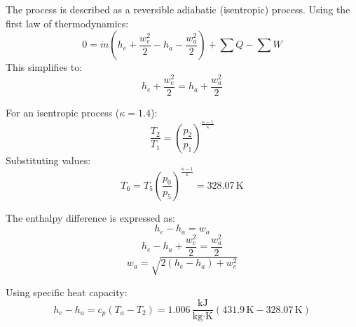 The process is described as a reversible adiabatic (isentropic) process. Using the first law of thermodynamics:  
\[
0 = \dot{m} \left( h_e + \frac{w_e^2}{2} - h_a - \frac{w_a^2}{2} \right) + \sum Q - \sum W
\]  
This simplifies to:  
\[
h_e + \frac{w_e^2}{2} = h_a + \frac{w_a^2}{2}
\]  

For an isentropic process (\( \kappa = 1.4 \)):  
\[
\frac{T_2}{T_1} = \left( \frac{p_2}{p_1} \right)^{\frac{\kappa - 1}{\kappa}}
\]  
Substituting values:  
\[
T_6 = T_5 \left( \frac{p_0}{p_5} \right)^{\frac{\kappa - 1}{\kappa}} = 328.07 \, \text{K}
\]  

The enthalpy difference is expressed as:  
\[
h_e - h_a = w_a
\]  
\[
h_e - h_a + \frac{w_e^2}{2} = \frac{w_a^2}{2}
\]  
\[
w_a = \sqrt{2(h_e - h_a) + w_e^2}
\]  

Using specific heat capacity:  
\[
h_e - h_a = c_p \left( T_a - T_2 \right) = 1.006 \, \frac{\text{kJ}}{\text{kg·K}} \left( 431.9 \, \text{K} - 328.07 \, \text{K} \right)
\]
